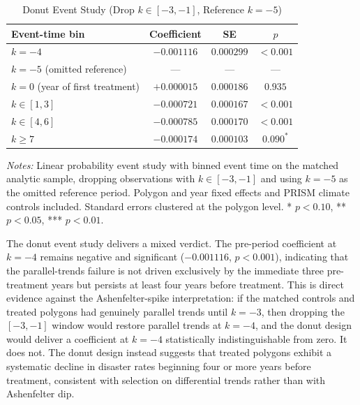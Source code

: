 \documentclass[12pt, letterpaper]{article}
\begin{document}
\begin{table}[H]
\centering
\small
\begin{threeparttable}
\caption{Donut Event Study (Drop $k \in [-3, -1]$, Reference $k = -5$)}
\label{tab:donut}
\begin{tabular}{lccc}
\toprule
Event-time bin & Coefficient & SE & $p$ \\
\midrule
$k = -4$ & $-0.001116$ & $0.000299$ & $< 0.001$ \\
$k = -5$ (omitted reference) & --- & --- & --- \\
$k = 0$ (year of first treatment) & $+0.000015$ & $0.000186$ & $0.935$ \\
$k \in [1, 3]$ & $-0.000721$ & $0.000167$ & $< 0.001$ \\
$k \in [4, 6]$ & $-0.000785$ & $0.000170$ & $< 0.001$ \\
$k \geq 7$ & $-0.000174$ & $0.000103$ & $0.090^{*}$ \\
\bottomrule
\end{tabular}
\begin{tablenotes}
\small
\item \textit{Notes:} Linear probability event study with binned event time on the matched analytic sample, dropping observations with $k \in [-3, -1]$ and using $k = -5$ as the omitted reference period. Polygon and year fixed effects and PRISM climate controls included. Standard errors clustered at the polygon level. * $p<0.10$, ** $p<0.05$, *** $p<0.01$.
\end{tablenotes}
\end{threeparttable}
\end{table}

The donut event study delivers a mixed verdict. The pre-period coefficient at $k = -4$ remains negative and significant ($-0.001116$, $p < 0.001$), indicating that the parallel-trends failure is not driven exclusively by the immediate three pre-treatment years but persists at least four years before treatment. This is direct evidence against the Ashenfelter-spike interpretation: if the matched controls and treated polygons had genuinely parallel trends until $k = -3$, then dropping the $[-3, -1]$ window would restore parallel trends at $k = -4$, and the donut design would deliver a coefficient at $k = -4$ statistically indistinguishable from zero. It does not. The donut design instead suggests that treated polygons exhibit a systematic decline in disaster rates beginning four or more years before treatment, consistent with selection on differential trends rather than with Ashenfelter dip.
\end{document}
